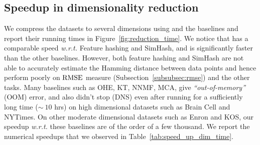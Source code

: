 

\subsection{Speedup in dimensionality reduction}\label{subsubsec:dim_red_time}
 We compress the datasets to several dimensions using \fsketch and the baselines and report their running times in Figure~\ref{fig:reduction_time}. We notice that \fsketch has a comparable speed \textit{w.r.t.} Feature hashing and SimHash, and is significantly faster than the other baselines. However, both feature hashing and SimHash are not able to accurately estimate the Hamming distance between data points and hence perform poorly on $\mathrm{RMSE}$ measure (Subsection~\ref{subsubsec:rmse}) and the other tasks. Many baselines such as OHE, KT, NNMF, MCA,  give \textit{``out-of-memory”} (OOM) error, and also didn’t stop (DNS) even after running for a sufficiently long time ($\sim~10$ hrs) on high dimensional datasets such as Brain Cell and NYTimes. On other moderate dimensional datasets such as Enron and KOS, our speedup \textit{w.r.t.} these baselines are of the order of a few thousand. We report the numerical speedups that we observed in Table~\ref{tab:speed_up_dim_time}.




